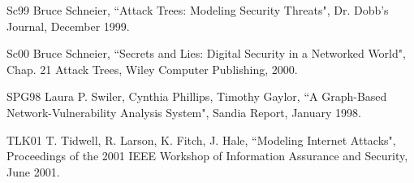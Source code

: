 \documentclass{llncs}
\begin{document}
\begin{thebibliography}{10}
\bibitem
{Sc99} Bruce Schneier,
``Attack Trees: Modeling Security Threats",
Dr. Dobb's Journal, December 1999.

\bibitem
{Sc00} Bruce Schneier,
``Secrets and Lies: Digital Security in a Networked World",
Chap. 21 Attack Trees, 
Wiley Computer Publishing, 2000.

\bibitem
{SPG98} Laura P. Swiler, Cynthia Phillips, Timothy Gaylor,
``A Graph-Based Network-Vulnerability Analysis System",
Sandia Report, January 1998.

\bibitem
{TLK01} T. Tidwell, R. Larson, K. Fitch, J. Hale,
``Modeling Internet Attacks", 
Proceedings of the 2001 IEEE Workshop of Information Assurance 
and Security, June 2001.

\end{thebibliography}
\end{document}
